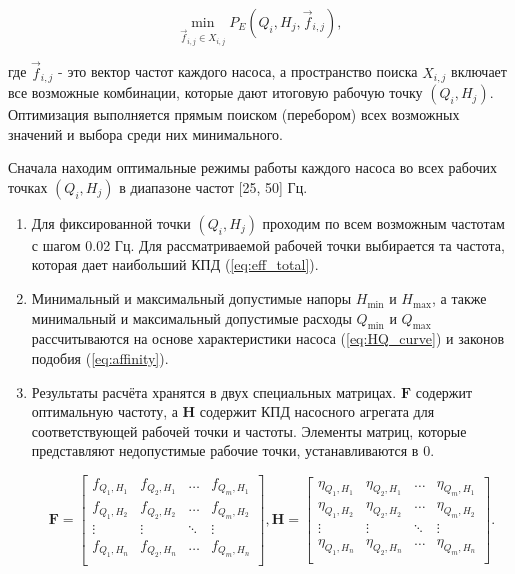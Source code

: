 \documentclass[a4paper, 12pt]{article}
\begin{document}
\begin{equation}
\underset{\vec{f}_{i,j} \in X_{i,j}}{\min} P_E\left(Q_i,H_j,\vec{f}_{i,j}\right),
\end{equation}

\noindent где \(\vec{f}_{i,j}\) - это вектор частот каждого насоса, а пространство
поиска \(X_{i,j}\) включает все возможные комбинации, которые дают
итоговую рабочую точку \((Q_i, H_j)\). Оптимизация выполняется прямым
поиском (перебором) всех возможных значений и выбора среди них
минимального.

Сначала находим оптимальные режимы работы каждого насоса во всех рабочих точках \((Q_i, H_j)\) в диапазоне частот [25, 50] Гц.

\begin{enumerate}

\item
Для фиксированной точки \((Q_i, H_j)\) проходим по всем возможным частотам с шагом 0.02 Гц. 
Для рассматриваемой рабочей точки выбирается та частота, которая дает наибольший КПД (\ref{eq:eff_total}).

\item
Минимальный и максимальный допустимые напоры \(H_{\min}\) и \(H_{\max}\), а также минимальный и максимальный допустимые расходы \(Q_{\min}\) и \(Q_{\max}\) рассчитываются на основе характеристики насоса (\ref{eq:HQ_curve}) и законов подобия (\ref{eq:affinity}).

\item
Результаты расчёта хранятся в двух специальных матрицах.
\(\mathbf{F}\) содержит оптимальную частоту, а \(\mathbf{H}\) содержит
КПД насосного агрегата для соответствующей рабочей точки и частоты. Элементы матриц,
которые представляют недопустимые рабочие точки, устанавливаются в 0.

\begin{equation}
	\mathbf{F} = \left[\begin{matrix}
		f_{Q_1,H_1} & f_{Q_2,H_1} & \dots & f_{Q_m,H_1} \\
		f_{Q_1,H_2} & f_{Q_2,H_2} & \dots & f_{Q_m,H_2} \\ 
		\vdots & \vdots & \ddots & \vdots \\
		f_{Q_1,H_n} & f_{Q_2,H_n} & \dots & f_{Q_m,H_n} \\
	\end{matrix}\right], 
	\mathbf{H} = \left[\begin{matrix}
		\eta_{Q_1,H_1} & \eta_{Q_2,H_1} & \dots & \eta_{Q_m,H_1} \\
		\eta_{Q_1,H_2} & \eta_{Q_2,H_2} & \dots & \eta_{Q_m,H_2} \\ 
		\vdots & \vdots & \ddots & \vdots \\
		\eta_{Q_1,H_n} & \eta_{Q_2,H_n} & \dots & \eta_{Q_m,H_n} \\
	\end{matrix}\right].
\end{equation}
\end{enumerate}
\end{document}
